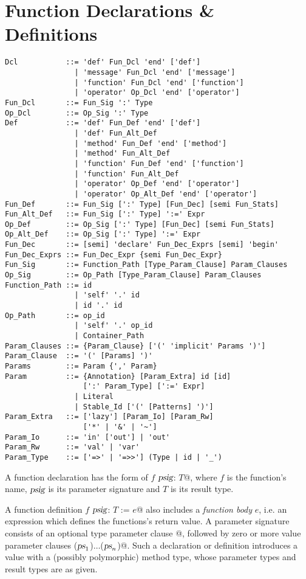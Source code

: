 \section{Function Declarations \& Definitions}
\label{sec:function-decls-defs}

\syntax\begin{lstlisting}
Dcl           ::= 'def' Fun_Dcl 'end' ['def']
                | 'message' Fun_Dcl 'end' ['message']
                | 'function' Fun_Dcl 'end' ['function']
                | 'operator' Op_Dcl 'end' ['operator']
Fun_Dcl       ::= Fun_Sig ':' Type
Op_Dcl        ::= Op_Sig ':' Type
Def           ::= 'def' Fun_Def 'end' ['def']
                | 'def' Fun_Alt_Def
                | 'method' Fun_Def 'end' ['method']
                | 'method' Fun_Alt_Def
                | 'function' Fun_Def 'end' ['function']
                | 'function' Fun_Alt_Def
                | 'operator' Op_Def 'end' ['operator']
                | 'operator' Op_Alt_Def 'end' ['operator']
Fun_Def       ::= Fun_Sig [':' Type] [Fun_Dec] [semi Fun_Stats]
Fun_Alt_Def   ::= Fun_Sig [':' Type] ':=' Expr
Op_Def        ::= Op_Sig [':' Type] [Fun_Dec] [semi Fun_Stats]
Op_Alt_Def    ::= Op_Sig [':' Type] ':=' Expr
Fun_Dec       ::= [semi] 'declare' Fun_Dec_Exprs [semi] 'begin'
Fun_Dec_Exprs ::= Fun_Dec_Expr {semi Fun_Dec_Expr}
Fun_Sig       ::= Function_Path [Type_Param_Clause] Param_Clauses
Op_Sig        ::= Op_Path [Type_Param_Clause] Param_Clauses
Function_Path ::= id
                | 'self' '.' id
                | id '.' id
Op_Path       ::= op_id
                | 'self' '.' op_id
                | Container_Path
Param_Clauses ::= {Param_Clause} ['(' 'implicit' Params ')']
Param_Clause  ::= '(' [Params] ')'
Params        ::= Param {',' Param}
Param         ::= {Annotation} [Param_Extra] id [id]
                  [':' Param_Type] [':=' Expr]
                | Literal
                | Stable_Id ['(' [Patterns] ')']
Param_Extra   ::= ['lazy'] [Param_Io] [Param_Rw] 
                  ['*' | '&' | '~']
Param_Io      ::= 'in' ['out'] | 'out'
Param_Rw      ::= 'val' | 'var'
Param_Type    ::= ['=>' | '=>>'] (Type | id | '_')
\end{lstlisting}

A function declaration has the form of \lstinline@def $f$ $\mbox{\sl psig}$: $T$@, where $f$ is the function's name, $\mbox{\sl psig}$ is its parameter signature and $T$ is its result type. 

A function definition \lstinline@def $f$ $\mbox{\sl psig}$: $T$ := $e$@ also includes a {\em function body} $e$, i.e. an expression which defines the functions's return value. A parameter signature consists of an optional type parameter clause \lstinline@[$\tps$]@, followed by zero or more value parameter clauses \lstinline@($\mbox{\sl ps}_1$)$\ldots$($\mbox{\sl ps}_n$)@. Such a declaration or definition introduces a value with a (possibly polymorphic) method type, whose parameter types and result types are as given. 

